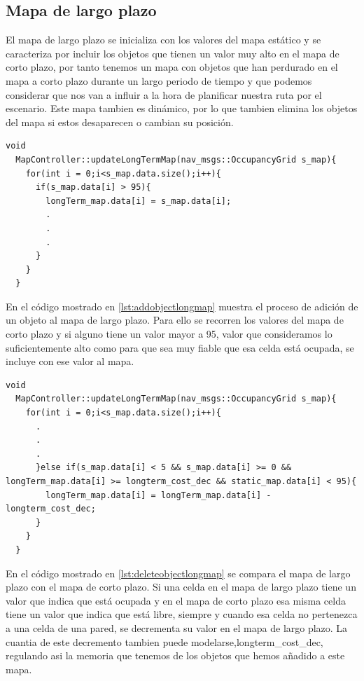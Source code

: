 \subsection{Mapa de largo plazo}
El mapa de largo plazo se inicializa con los valores del mapa estático y se caracteriza por incluir los objetos que tienen un valor muy alto en el mapa de corto plazo, por tanto tenemos un mapa con objetos que han perdurado en el mapa a corto plazo durante un largo periodo de tiempo y que podemos considerar que nos van a influir a la hora de planificar nuestra ruta por el escenario. 
Este mapa tambien es dinámico, por lo que tambien elimina los objetos del mapa si estos desaparecen o cambian su posición.
\pagebreak 

\begin{lstlisting}[caption=Procedimiento para añadir un objeto al mapa de largo plazo, label={lst:addobjectlongmap}]
  void
  MapController::updateLongTermMap(nav_msgs::OccupancyGrid s_map){
    for(int i = 0;i<s_map.data.size();i++){
      if(s_map.data[i] > 95){
        longTerm_map.data[i] = s_map.data[i]; 
        .
        .
        .
      }
    }
  } 

\end{lstlisting}

En el código mostrado en \ref{lst:addobjectlongmap} muestra el proceso de adición de un objeto al mapa de largo plazo. Para ello se recorren los valores del mapa de corto plazo y si alguno tiene un valor mayor a 95, valor que consideramos lo suficientemente alto como para que sea muy fiable que esa celda está ocupada, se incluye con ese valor al mapa.

\begin{lstlisting}[caption=Procedimiento para eliminar un objeto al mapa de largo plazo, label={lst:deleteobjectlongmap}]
  void
  MapController::updateLongTermMap(nav_msgs::OccupancyGrid s_map){
    for(int i = 0;i<s_map.data.size();i++){
      .
      .
      .
      }else if(s_map.data[i] < 5 && s_map.data[i] >= 0 && longTerm_map.data[i] >= longterm_cost_dec && static_map.data[i] < 95){
        longTerm_map.data[i] = longTerm_map.data[i] - longterm_cost_dec;
      }
    }
  } 

\end{lstlisting}

En el código mostrado en \ref{lst:deleteobjectlongmap} se compara el mapa de largo plazo con el mapa de corto plazo. Si una celda en el mapa de largo plazo tiene un valor que indica que está ocupada y en el mapa de corto plazo esa misma celda tiene un valor que indica que está libre, siempre y cuando esa celda no pertenezca a una celda de una pared, se decrementa su valor en el mapa de largo plazo. La cuantia de este decremento tambien puede modelarse,longterm\_cost\_dec, regulando asi la memoria que tenemos de los objetos que hemos añadido a este mapa.\\

